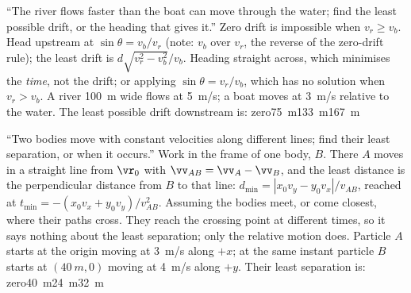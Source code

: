 {``The river flows faster than the boat can move through the water; find the least possible drift, or
the heading that gives it.''}
{Zero drift is impossible when $v_r\ge v_b$. Head upstream at $\sin\theta=v_b/v_r$ (note: $v_b$ over
$v_r$, the reverse of the zero-drift rule); the least drift is $d\sqrt{v_r^2-v_b^2}/v_b$.}
{Heading straight across, which minimises the \emph{time}, not the drift; or applying
$\sin\theta=v_r/v_b$, which has no solution when $v_r>v_b$.}
{A river \SI{100}{m} wide flows at \SI{5}{m/s}; a boat moves at \SI{3}{m/s} relative to the water. The
least possible drift downstream is:}
{zero}{\SI{75}{m}}{\SI{133}{m}}{\SI{167}{m}}

{``Two bodies move with constant velocities along different lines; find their least separation, or
when it occurs.''}
{Work in the frame of one body, $B$. There $A$ moves in a straight line from $\vr_0$ with
$\vv_{AB}=\vv_A-\vv_B$, and the least distance is the perpendicular distance from $B$ to that line:
$d_{\min}=|x_0v_y-y_0v_x|/v_{AB}$, reached at $t_{\min}=-(x_0v_x+y_0v_y)/v_{AB}^2$.}
{Assuming the bodies meet, or come closest, where their paths cross. They reach the crossing point at
different times, so it says nothing about the least separation; only the relative motion does.}
{Particle $A$ starts at the origin moving at \SI{3}{m/s} along $+x$; at the same instant particle $B$
starts at $(\SI{40}{m},0)$ moving at \SI{4}{m/s} along $+y$. Their least separation is:}
{zero}{\SI{40}{m}}{\SI{24}{m}}{\SI{32}{m}}
